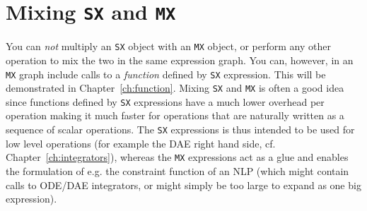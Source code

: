 \documentclass[a4paper,12pt]{book}
\newcommand{\CasADi}{\texttt{CasADi}\xspace}
\newcounter{pytexcount}
\newcounter{pytexsubcount}
\newenvironment{pytexTemplate}[1]{
\begin{rawhtml}
<div style="display:none">
\end{rawhtml}
}{
\begin{rawhtml}
</div>
\end{rawhtml}
}
\newcommand{\pytexStart}[1]{
  \addtocounter{pytexcount}{1}%
  \setcounter{pytexsubcount}{0}%
}
\renewenvironment{pytex}
{\addtocounter{pytexsubcount}{1}%
\begin{rawhtml}
<div style="color: black; background-color: \#b9c8db;  border-style: dotted; border-width: 1px; padding:2px;padding-left:1em" >
<pre>
\end{rawhtml}
}%
{\begin{rawhtml}
</pre>
</div>
<div style="color: black; background-color: \#fffff;  border-style: solid; border-width: 1px; padding:2px;padding-left:1em;margin-left:1em;" >\end{rawhtml}%
\verbatiminputeval{pytex_\alph{pytexcount}_\arabic{pytexsubcount}.log}%
\begin{rawhtml}
</div>
\end{rawhtml}
}
\begin{document}






\section{Mixing \texttt{SX} and \texttt{MX}}
You can \emph{not} multiply an \texttt{SX} object with an \texttt{MX} object, or perform any other operation to mix the two in the same expression graph. You can, however, in an \texttt{MX} graph include calls to a \emph{function} defined by \texttt{SX} expression. This will be demonstrated in Chapter~\ref{ch:function}. Mixing \texttt{SX} and \texttt{MX} is often a good idea since functions defined by \texttt{SX} expressions have a much lower overhead per operation making it much faster for operations that are naturally written as a sequence of scalar operations. The \texttt{SX} expressions is thus intended to be used for low level operations (for example the DAE right hand side, cf. Chapter~\ref{ch:integrators}), whereas the \texttt{MX} expressions act as a glue and enables the formulation of e.g. the constraint function of an NLP (which might contain calls to ODE/DAE integrators, or might simply be too large to expand as one big expression).
\end{document}
